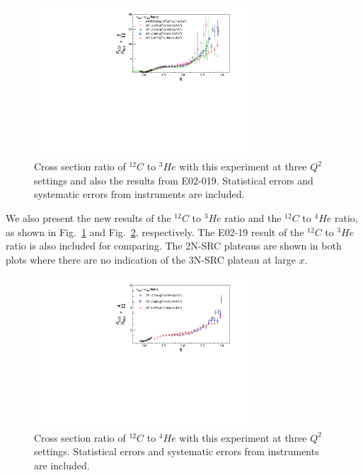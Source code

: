 		\begin{figure}[!ht]
		\begin{center}
		\includegraphics[width=8.0cm]{./figures/C12_He3_XS_Ratio_DpTh40_DpTh40_L.pdf}
		\end{center}
		\vspace*{-5mm}
		\caption{Cross section ratio of $^{12}C$ to $^{3}He$ with this experiment at three $Q^{2}$ settings and also the results from E02-019. Statistical errors and systematic errors from instruments are included.}
		\label{c12_he3}
		\end{figure}
		We also present the new results of the $^{12}C$ to $^{3}He$ ratio and the $^{12}C$ to $^{4}He$ ratio, as shown in Fig.~\ref{c12_he3} and Fig.~\ref{c12_he4}, respectively. The E02-19 result of the $^{12}C$ to $^{3}He$ ratio is also included for comparing. The 2N-SRC plateaus are shown in both plots where there are no indication of the 3N-SRC plateau at large $x$.

		\begin{figure}[!ht]
		\begin{center}
		\includegraphics[width=8.0cm]{./figures/C12_He4_XS_Ratio_DpTh40_DpTh40_L.pdf}
		\end{center}
		\vspace*{-5mm}
		\caption{Cross section ratio of $^{12}C$ to $^{4}He$ with this experiment at three $Q^{2}$ settings. Statistical errors and systematic errors from instruments are included.}
		\label{c12_he4}
		\end{figure}


